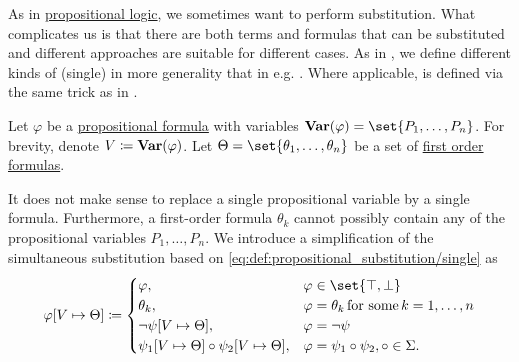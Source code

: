 \begin{definition}\label{def:first_order_substitution}
  As in \hyperref[subsec:propositional_logic]{propositional logic}, we sometimes want to perform substitution. What complicates us is that there are both terms and formulas that can be substituted and different approaches are suitable for different cases. As in , we define different kinds of (single)  in more generality that in e.g. \cite[def. 14.25]{OpenLogic20201202}. Where applicable,  is defined via the same trick as in .

  \begin{thmenum}
     Let \( \varphi \) be a \hyperref[def:propositional_syntax/formula]{propositional formula} with variables \( \boldop{Var}(\varphi) = \set{ P_1, \ldots, P_n } \). For brevity, denote \( V \coloneqq \operatorname{\mathbf{Var}}(\varphi) \). Let \( \Theta = \set{ \theta_1, \ldots, \theta_n } \) be a set of \hyperref[def:first_order_syntax/formula]{first order formulas}.

    It does not make sense to replace a single propositional variable by a single formula. Furthermore, a first-order formula \( \theta_k \) cannot possibly contain any of the propositional variables \( P_1, \ldots, P_n \). We introduce a simplification of the simultaneous substitution based on \eqref{eq:def:propositional_substitution/single} as
    \begin{equation}\label{eq:def:first_order_substitution/predicate}
      \varphi[V \mapsto \Theta] \coloneqq \begin{cases}
        \varphi,                                             &\varphi \in \set{ \top, \bot } \\
        \theta_k,                                            &\varphi = \theta_k \T{for some} k = 1, \ldots, n \\
        \neg \psi[V \mapsto \Theta],                           &\varphi = \neg \psi \\
        \psi_1[V \mapsto \Theta] \circ \psi_2[V \mapsto \Theta], &\varphi = \psi_1 \circ \psi_2, \circ \in \Sigma.
      \end{cases}
    \end{equation}


\end{thmenum}
\end{definition}
